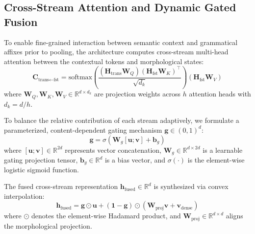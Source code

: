 \subsection{Cross-Stream Attention and Dynamic Gated Fusion}
To enable fine-grained interaction between semantic context and grammatical affixes prior to pooling, the architecture computes cross-stream multi-head attention between the contextual tokens and morphological states:
\begin{equation}
    \label{eq:cross_stream_attention}
    \mathbf{C}_{\text{trans} \leftarrow \text{fst}} = \mathrm{softmax}\left(\frac{(\mathbf{H}_{\text{trans}} \mathbf{W}_Q) (\mathbf{H}_{\text{fst}} \mathbf{W}_K)^\top}{\sqrt{d_k}}\right) (\mathbf{H}_{\text{fst}} \mathbf{W}_V)
\end{equation}
where $\mathbf{W}_Q, \mathbf{W}_K, \mathbf{W}_V \in \mathbb{R}^{d \times d_k}$ are projection weights across $h$ attention heads with $d_k = d/h$.

To balance the relative contribution of each stream adaptively, we formulate a parameterized, content-dependent gating mechanism $\mathbf{g} \in (0, 1)^d$:
\begin{equation}
    \label{eq:dynamic_gate}
    \mathbf{g} = \sigma\left(\mathbf{W}_g [\mathbf{u} \mathbin{;} \mathbf{v}] + \mathbf{b}_g\right)
\end{equation}
where $[\mathbf{u} \mathbin{;} \mathbf{v}] \in \mathbb{R}^{2d}$ represents vector concatenation, $\mathbf{W}_g \in \mathbb{R}^{d \times 2d}$ is a learnable gating projection tensor, $\mathbf{b}_g \in \mathbb{R}^d$ is a bias vector, and $\sigma(\cdot)$ is the element-wise logistic sigmoid function.

The fused cross-stream representation $\mathbf{h}_{\text{fused}} \in \mathbb{R}^d$ is synthesized via convex interpolation:
\begin{equation}
    \label{eq:fused_representation}
    \mathbf{h}_{\text{fused}} = \mathbf{g} \odot \mathbf{u} + (\mathbf{1} - \mathbf{g}) \odot \left(\mathbf{W}_{\text{proj}} \mathbf{v} + \mathbf{v}_{\text{dense}}\right)
\end{equation}
where $\odot$ denotes the element-wise Hadamard product, and $\mathbf{W}_{\text{proj}} \in \mathbb{R}^{d \times d}$ aligns the morphological projection.

